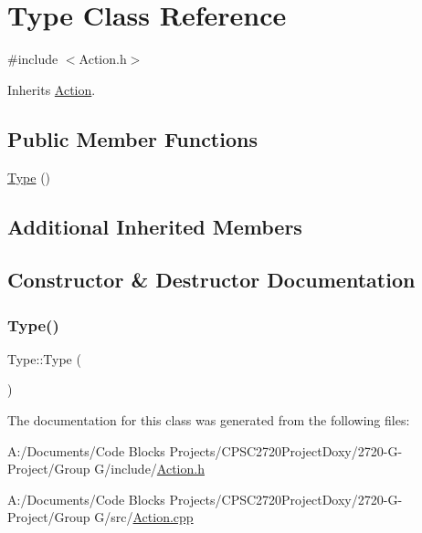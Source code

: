 \hypertarget{class_type}{}\section{Type Class Reference}
\label{class_type}


{\ttfamily \#include $<$Action.\+h$>$}



Inherits \mbox{\hyperlink{class_action}{Action}}.

\subsection*{Public Member Functions}
\begin{DoxyCompactItemize}
\item 
\mbox{\hyperlink{class_type_a78339313d36891f18427c431ea84e306}{Type}} ()
\end{DoxyCompactItemize}
\subsection*{Additional Inherited Members}


\subsection{Constructor \& Destructor Documentation}
\mbox{\label{class_type_a78339313d36891f18427c431ea84e306}} 
\subsubsection{\texorpdfstring{Type()}{Type()}}
{\footnotesize\ttfamily Type\+::\+Type (\begin{DoxyParamCaption}{ }\end{DoxyParamCaption})}



The documentation for this class was generated from the following files\+:\begin{DoxyCompactItemize}
\item 
A\+:/\+Documents/\+Code Blocks Projects/\+C\+P\+S\+C2720\+Project\+Doxy/2720-\/\+G-\/\+Project/\+Group G/include/\mbox{\hyperlink{_action_8h}{Action.\+h}}\item 
A\+:/\+Documents/\+Code Blocks Projects/\+C\+P\+S\+C2720\+Project\+Doxy/2720-\/\+G-\/\+Project/\+Group G/src/\mbox{\hyperlink{_action_8cpp}{Action.\+cpp}}\end{DoxyCompactItemize}

